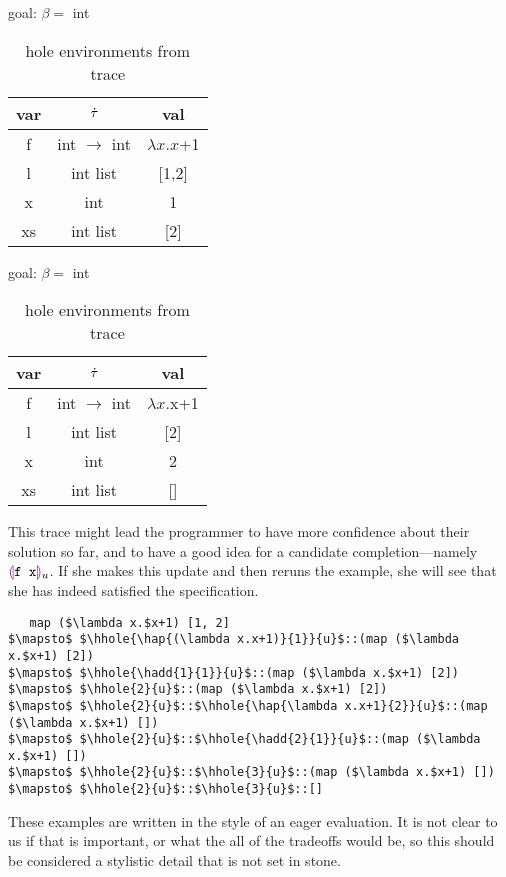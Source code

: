 \begin{table}[h!]
  \begin{subtable}{.5\linewidth}
    \caption{goal: $\beta=$ int}
    \centering
        {
          \footnotesize
          \begin{tabular}{c|c|c}
            var & $\dot{\tau}$ & val\\
            \hline
            f & int $\to$ int & $\lambda x.x$+1\\
            l & int list & [1,2]\\
            x & int & 1\\
            xs & int list & [2]\\
          \end{tabular}
        }
  \end{subtable}%
  \begin{subtable}{.5\linewidth}
    \caption{goal: $\beta=$ int}
    \centering
        {
          \footnotesize
          \begin{tabular}{c|c|c}
            var & $\dot{\tau}$ & val\\
            \hline
            f & int $\to$ int & $\lambda x.$x+1\\
            l & int list & [2]\\
            x & int & 2\\
            xs & int list & []\\
          \end{tabular}
        }
  \end{subtable}
  \caption{hole environments from trace}
  \label{tabx}
\end{table}

This trace might lead the programmer to have more confidence about their
solution so far, and to have a good idea for a candidate
completion---namely $\textcolor{violet}{\llparenthesis}\texttt{f x}\textcolor{violet}{\rrparenthesis}_{u}$. If she makes this update and
then reruns the example, she will see that she has indeed satisfied the
specification.
\hspace{1cm}
\begin{lstlisting}
   map ($\lambda x.$x+1) [1, 2]
$\mapsto$ $\hhole{\hap{(\lambda x.x+1)}{1}}{u}$::(map ($\lambda x.$x+1) [2])
$\mapsto$ $\hhole{\hadd{1}{1}}{u}$::(map ($\lambda x.$x+1) [2])
$\mapsto$ $\hhole{2}{u}$::(map ($\lambda x.$x+1) [2])
$\mapsto$ $\hhole{2}{u}$::$\hhole{\hap{\lambda x.x+1}{2}}{u}$::(map ($\lambda x.$x+1) [])
$\mapsto$ $\hhole{2}{u}$::$\hhole{\hadd{2}{1}}{u}$::(map ($\lambda x.$x+1) [])
$\mapsto$ $\hhole{2}{u}$::$\hhole{3}{u}$::(map ($\lambda x.$x+1) [])
$\mapsto$ $\hhole{2}{u}$::$\hhole{3}{u}$::[]
\end{lstlisting}

These examples are written in the style of an eager evaluation. It is not
clear to us if that is important, or what the all of the tradeoffs would
be, so this should be considered a stylistic detail that is not set in
stone.
